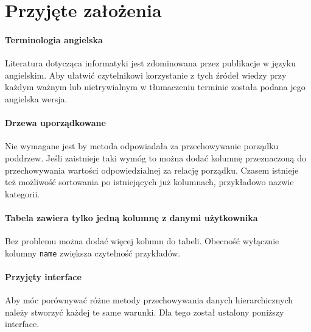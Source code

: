 \section{Przyjęte założenia}


\paragraph{Terminologia angielska}
Literatura dotycząca informatyki jest zdominowana przez publikacje w języku angielskim.
Aby ułatwić czytelnikowi korzystanie z tych źródeł wiedzy przy każdym ważnym lub nietrywialnym w tłumaczeniu terminie została podana jego angielska wersja.



\paragraph{Drzewa uporządkowane}
Nie wymagane jest by metoda odpowiadała za przechowywanie porządku poddrzew.
Jeśli zaistnieje taki wymóg to można dodać kolumnę przeznaczoną do przechowywania wartości odpowiedzialnej za relację porządku.
Czasem istnieje też możliwość sortowania po istniejących już kolumnach, przykładowo nazwie kategorii.


\paragraph{Tabela zawiera tylko jedną kolumnę z danymi użytkownika} 
Bez problemu można dodać więcej kolumn do tabeli.
Obecność wyłącznie kolumny \texttt{name} zwiększa czytelność przykładów.


\paragraph{Przyjęty interface}

Aby móc porównywać różne metody przechowywania danych hierarchicznych należy stworzyć każdej te same warunki.
Dla tego został ustalony poniższy interface.

